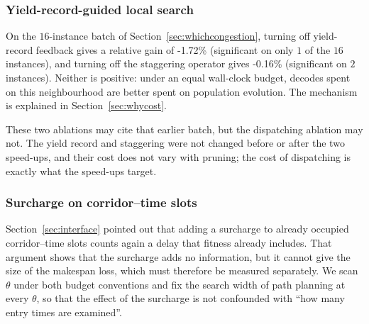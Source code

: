 \documentclass[manuscript,screen,review]{acmart}
\newcommand{\MatrixCells}{16}
\newcommand{\GainCertMatrix}{-1.72\%}    %
\newcommand{\GainStaggerMatrix}{-0.16\%} %
\begin{document}
\subsubsection{Yield-record-guided local search}
On the $\MatrixCells$-instance batch of Section~\ref{sec:whichcongestion}, turning off yield-record feedback gives a relative gain of \GainCertMatrix{} (significant on only $1$ of the $\MatrixCells$ instances), and turning off the staggering operator gives \GainStaggerMatrix{} (significant on $2$ instances). Neither is positive: under an equal wall-clock budget, decodes spent on this neighbourhood are better spent on population evolution. The mechanism is explained in Section~\ref{sec:whycost}.

These two ablations may cite that earlier batch, but the dispatching ablation may not. The yield record and staggering were not changed before or after the two speed-ups, and their cost does not vary with pruning; the cost of dispatching is exactly what the speed-ups target.

\subsubsection{Surcharge on corridor--time slots}
Section~\ref{sec:interface} pointed out that adding a surcharge to already occupied corridor--time slots counts again a delay that fitness already includes. That argument shows that the surcharge adds no information, but it cannot give the size of the makespan loss, which must therefore be measured separately.
We scan $\theta$ under both budget conventions and fix the search width of path planning at every $\theta$, so that the effect of the surcharge is not confounded with ``how many entry times are examined''.
\end{document}
